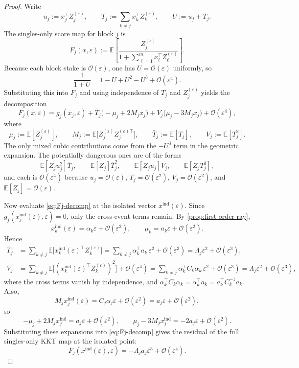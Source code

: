 \documentclass[11pt]{article}
\numberwithin{equation}{section}
\theoremstyle{remark}
\theoremstyle{definition}
\newcommand{\E}{\mathbb{E}}
\newcommand{\1}{\mathbf{1}}
\newcommand{\OO}{\mathcal{O}}
\newcommand{\eps}{\varepsilon}
\newcommand{\ind}{\mathrm{ind}}
\begin{document}
\begin{proof}
Write
\[
  u_j:=x_j^\top Z_j^{(\eps)},
  \qquad
  T_j:=\sum_{k\ne j} x_k^\top Z_k^{(\eps)},
  \qquad
  U:=u_j+T_j.
\]
The singles-only score map for block $j$ is
\[
  F_j(x,\eps):=\E\!\left[\frac{Z_j^{(\eps)}}{1+\sum_{\ell=1}^m x_\ell^\top Z_\ell^{(\eps)}}\right].
\]
Because each block stake is $\OO(\eps)$, one has $U=\OO(\eps)$ uniformly, so
\[
  \frac{1}{1+U}=1-U+U^2-U^3+\OO(\eps^4).
\]
Substituting this into $F_j$ and using independence of $T_j$ and $Z_j^{(\eps)}$ yields the decomposition
\begin{equation}
  F_j(x,\eps)
  = g_j(x_j,\eps)
    + \bar T_j\bigl(-\mu_j+2M_jx_j\bigr)
    + V_j\bigl(\mu_j-3M_jx_j\bigr)
    + \OO(\eps^4),
  \label{eq:Fj-decomp}
\end{equation}
where
\[
  \mu_j:=\E[Z_j^{(\eps)}],
  \qquad
  M_j:=\E\bigl[Z_j^{(\eps)}Z_j^{(\eps)\top}\bigr],
  \qquad
  \bar T_j:=\E[T_j],
  \qquad
  V_j:=\E[T_j^2].
\]
The only mixed cubic contributions come from the $-U^3$ term in the geometric expansion. The potentially dangerous ones are of the forms
\[
  \E[Z_j u_j^2]\bar T_j,
  \qquad
  \E[Z_j]\bar T_j^2,
  \qquad
  \E[Z_j u_j]V_j,
  \qquad
  \E[Z_jT_j^3],
\]
and each is $\OO(\eps^4)$ because $u_j=\OO(\eps)$, $\bar T_j=\OO(\eps^2)$, $V_j=\OO(\eps^2)$, and $\E[Z_j]=\OO(\eps)$.

Now evaluate \eqref{eq:Fj-decomp} at the isolated vector $x^{\ind}(\eps)$. Since $g_j(x_j^{\ind}(\eps),\eps)=0$, only the cross-event terms remain. By \cref{prop:first-order-ray},
\[
  x_k^{\ind}(\eps)=\alpha_k\eps+\OO(\eps^2),
  \qquad
  \mu_k=a_k\eps+\OO(\eps^2).
\]
Hence
\begin{align}
  \bar T_j
   &= \sum_{k\ne j}\E\bigl[x_k^{\ind}(\eps)^\top Z_k^{(\eps)}\bigr]
    = \sum_{k\ne j}\alpha_k^\top a_k\,\eps^2+\OO(\eps^3)
    = \Lambda_j\eps^2+\OO(\eps^3),
    \label{eq:Tbar-asymp}\\
  V_j
   &= \sum_{k\ne j}\E\bigl[(x_k^{\ind}(\eps)^\top Z_k^{(\eps)})^2\bigr]+\OO(\eps^4)
    = \sum_{k\ne j}\alpha_k^\top C_k\alpha_k\,\eps^2+\OO(\eps^3)
    = \Lambda_j\eps^2+\OO(\eps^3),
    \label{eq:Vj-asymp}
\end{align}
where the cross terms vanish by independence, and $\alpha_k^\top C_k\alpha_k=\alpha_k^\top a_k=a_k^\top C_k^{-1}a_k$. Also,
\[
  M_jx_j^{\ind}(\eps)=C_j\alpha_j\eps+\OO(\eps^2)=a_j\eps+\OO(\eps^2),
\]
so
\[
  -\mu_j+2M_jx_j^{\ind}=a_j\eps+\OO(\eps^2),
  \qquad
  \mu_j-3M_jx_j^{\ind}=-2a_j\eps+\OO(\eps^2).
\]
Substituting these expansions into \eqref{eq:Fj-decomp} gives the residual of the full singles-only KKT map at the isolated point:
\begin{equation}
  F_j(x^{\ind}(\eps),\eps)
  = -\Lambda_j a_j\eps^3+\OO(\eps^4).
  \label{eq:residual}
\end{equation}


\end{proof}
\end{document}
